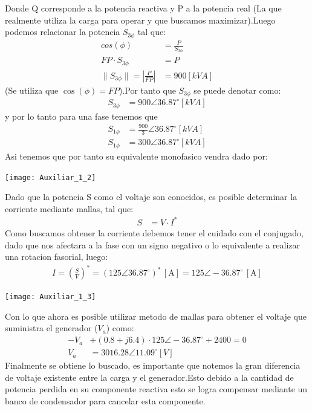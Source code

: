 \documentclass[
  11pt,
  letterpaper,
   addpoints,
  ]{exam}
\begin{document}
\begin{questions}
\begin{solution}
\begin{center}
    \end{center}
    Donde Q corresponde a la potencia reactiva y P a la potencia real (La que realmente utiliza la carga para operar y que buscamos maximizar).Luego podemos relacionar la potencia $S_{3\phi}$ tal que:
    \begin{align}
        cos(\phi) &= \frac{P}{S_{3\phi}}\\
        FP \cdot S_{3\phi}&= P\\
        \|S_{3\phi}\| = \left|\frac{P}{FP} \right| &= 900[kVA]
    \end{align}
    (Se utiliza que $\cos(\phi) = FP$).Por tanto que $S_{3\phi}$ se puede denotar como:
    \begin{align}
        S_{3\phi} &= 900 \angle 36.87^{\circ} [kVA]
    \end{align}
    y por lo tanto para una fase tenemos que 
    \begin{align}
        S_{1\phi} &= \frac{900}{3} \angle 36.87^{\circ} [kVA]\\
        S_{1\phi} &= 300 \angle 36.87^{\circ} [kVA]
    \end{align}
    Asi tenemos que por tanto su equivalente monofasico vendra dado por:
    \begin{center}
        \texttt{[image: Auxiliar\_1\_2]}
      \end{center}
    Dado que la potencia S como el voltaje son conocidos, es posible determinar la corriente mediante mallas, tal que:
    \begin{align}
        S &= V \cdot I^{*} 
    \end{align}
    Como buscamos obtener la corriente debemos tener el cuidado con el conjugado, dado que nos afectara a la fase con un signo negativo o lo equivalente a realizar una rotacion fasorial, luego:
    \begin{align}
        I = \left( \frac{S}{V}\right)^{*} = \left(125 \angle 36.87^{\circ}\right)^{*}\,[\text{A}] = 125 \angle -36.87^{\circ}\,[\text{A}]
    \end{align}
    \begin{center}
        \texttt{[image: Auxiliar\_1\_3]}
      \end{center}
    Con lo que ahora es posible utilizar metodo de mallas para obtener el voltaje que suministra el generador ($V_{a}$) como: 
    \begin{align}
      -V_{a} &+ (0.8 + j6.4) \cdot 125 \angle -36.87^{\circ} + 2400 = 0\\
      V_{a} &= 3016.28 \angle 11.09^{\circ} [V]
    \end{align}
Finalmente se obtiene lo buscado, es importante que notemos la gran diferencia de voltaje existente entre la carga y el generador.Esto debido a la cantidad de potencia perdida en su componente reactiva esto se logra compensar mediante un banco de condensador para cancelar esta componente.

\end{solution}
\end{questions}
\end{document}
